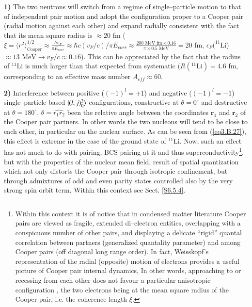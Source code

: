 \begin{subappendices}
    
\textbf{1)} The two neutrons will switch from a regime of single--particle motion to that of independent pair motion and adopt the configuration proper to a Cooper pair (radial motion against each other) and expand radially consistent with the fact that its mean square radius is $\approx20$ fm ($\xi=\langle r^2\rangle^{1/2}_{\text{Cooper}}\approx\frac{\hbar v_F}{\pi E_{corr}}\approx \hbar c(v_F/c)/\pi E_{corr}\approx\frac{200\text{ MeV fm}\times 0.16}{\pi \times0.5\text{ MeV}}=20$ fm, $\epsilon_F(^{11}$Li)$\approx 13\text{ MeV}\rightarrow v_F/c\approx 0.16$). This can be appreciated by the fact that the radius of $^{11}$Li is much larger than that expected from systematic $(R(^{11}\text{Li})=4.6 $ fm, corresponding to an effective mass number $A_{eff}\approx60$.
    	
    				
 \textbf{2)} Interference between positive ($(-1)^l=+1$) and negative ($(-1)^l=-1$) single--particle based $|{(l,j)^2_0} \rangle$ configurations, constructive at $\theta=0^\circ$ and destructive at $\theta=180^\circ$, $\theta=\hat{r_1r_2}$ been the relative angle between the coordinates $\mathbf r_1$ and $\mathbf r_2$ of the Cooper pair partners. In other words the two nucleons will tend to be close to each other, in particular on the nuclear surface. As can be seen from (\ref{eq3.B.27}), this effect is extreme in the case of the ground state of $^{11}$Li. Now, such an effect has not much to do with pairing, BCS pairing at it and thus superconductivity\footnote{Within this context it is of notice that in condensed matter literature Cooper pairs are viewed as fragile, extended di--electron entities, overlapping with a conspicuous number of other pairs, and displaying a delicate ``rigid'' quantal correlation between partners (generalized quantality parameter) and among Cooper pairs (off diagonal long range order). In fact, Weisskopf's representation of the radial (opposite) motion of electrons provides a useful picture of Cooper pair internal dynamics, In other words, approaching to or recessing from each other does not favour a particular anisotropic configuration , the two electrons being at the mean square radius of the Cooper pair, i.e. the coherence length $\xi$.}, but with the properties of the nuclear mean field, result of spatial quantization which not only distorts the Cooper pair through isotropic confinement, but through admixtures of odd and even parity states controlled also by the very strong spin orbit term. Within this context see Sect. \ref{S6.5.4}.									


\end{subappendices}
